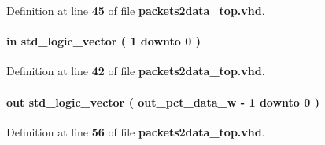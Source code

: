 Definition at line {\bf 45} of file {\bf packets2data\+\_\+top.\+vhd}.

\paragraph[{sample\+\_\+width}]{ {\bfseries \textcolor{keywordflow}{in}\textcolor{vhdlchar}{ }} {\bfseries \textcolor{comment}{std\+\_\+logic\+\_\+vector}\textcolor{vhdlchar}{ }\textcolor{vhdlchar}{(}\textcolor{vhdlchar}{ }\textcolor{vhdlchar}{ } \textcolor{vhdldigit}{1} \textcolor{vhdlchar}{ }\textcolor{keywordflow}{downto}\textcolor{vhdlchar}{ }\textcolor{vhdlchar}{ } \textcolor{vhdldigit}{0} \textcolor{vhdlchar}{ }\textcolor{vhdlchar}{)}\textcolor{vhdlchar}{ }} \hspace{0.3cm}{\ttfamily [Port]}}\label{classpackets2data__top_aa4357f9a7d7e21fa49f9ce61eec07e23}


Definition at line {\bf 42} of file {\bf packets2data\+\_\+top.\+vhd}.

\paragraph[{smpl\+\_\+buff\+\_\+q}]{ {\bfseries \textcolor{keywordflow}{out}\textcolor{vhdlchar}{ }} {\bfseries \textcolor{comment}{std\+\_\+logic\+\_\+vector}\textcolor{vhdlchar}{ }\textcolor{vhdlchar}{(}\textcolor{vhdlchar}{ }\textcolor{vhdlchar}{ }\textcolor{vhdlchar}{ }\textcolor{vhdlchar}{ }{\bfseries {\bf out\+\_\+pct\+\_\+data\+\_\+w}} \textcolor{vhdlchar}{-\/}\textcolor{vhdlchar}{ } \textcolor{vhdldigit}{1} \textcolor{vhdlchar}{ }\textcolor{keywordflow}{downto}\textcolor{vhdlchar}{ }\textcolor{vhdlchar}{ } \textcolor{vhdldigit}{0} \textcolor{vhdlchar}{ }\textcolor{vhdlchar}{)}\textcolor{vhdlchar}{ }} \hspace{0.3cm}{\ttfamily [Port]}}\label{classpackets2data__top_ac0b2c64b9b6f3eda9c78c9807d8753dd}


Definition at line {\bf 56} of file {\bf packets2data\+\_\+top.\+vhd}.

